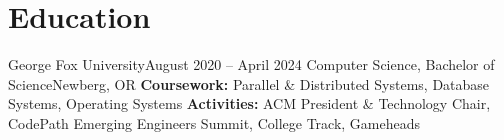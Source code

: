 \section{Education}
  \resumeSubHeadingListStart
    \resumeEducationSubheading
        {George Fox University}{August 2020 -- April 2024}
        {Computer Science, Bachelor of Science}{Newberg, OR}
        {\textbf{Coursework:} Parallel \& Distributed Systems, Database Systems, Operating Systems}
        {\textbf{Activities:} ACM President \& Technology Chair, CodePath Emerging Engineers Summit, College Track, Gameheads}
  \resumeSubHeadingListEnd


